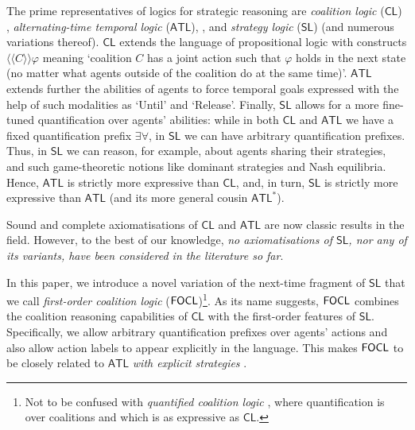\documentclass{article}
\begin{document}
The prime representatives of logics for strategic reasoning are \textit{coalition logic} ($\mathsf{CL}$) \cite{pauly02}, \textit{alternating-time temporal logic} ($\mathsf{ATL}$), \cite{alur02}, and \textit{strategy logic} ($\mathsf{SL}$) \cite{mogavero10} (and numerous variations thereof). $\mathsf{CL}$ extends the language of propositional logic with constructs $\langle \! \langle C \rangle \! \rangle \varphi$ meaning `coalition $C$ has a joint action such that $\varphi$ holds in the next state (no matter what agents outside of the coalition do at the same time)'. $\mathsf{ATL}$ extends further the abilities of agents to force temporal goals expressed with the help of such modalities as `\textsf{U}ntil' and `\textsf{R}elease'. Finally, $\mathsf{SL}$ allows for a more fine-tuned quantification over agents' abilities: while in both $\mathsf{CL}$ and $\mathsf{ATL}$ we have a fixed quantification prefix $\exists \forall$, in $\mathsf{SL}$ we can have arbitrary quantification prefixes. Thus, in $\mathsf{SL}$ we can reason, for example, about agents sharing their strategies, and such game-theoretic notions like dominant strategies and Nash equilibria.  Hence, $\mathsf{ATL}$ is strictly more expressive than $\mathsf{CL}$, and, in turn, $\mathsf{SL}$ is strictly more expressive than $\mathsf{ATL}$ (and its more general cousin $\mathsf{ATL}^\ast$).



Sound and complete axiomatisations of $\mathsf{CL}$ \cite{pauly02,goranko13} and $\mathsf{ATL}$ \cite{goranko06} are now classic results in the field. However, to the best of our knowledge, \textit{no axiomatisations of $\mathsf{SL}$, nor any of its variants, have been considered in the literature so far}. 

In this paper, we introduce a novel variation of the next-time fragment of $\mathsf{SL}$ that we call \textit{first-order coalition logic} ($\mathsf{FOCL}$)\footnote{Not to be confused with \textit{quantified coalition logic} \cite{agotnes08}, where quantification is over coalitions and which is as expressive as $\mathsf{CL}$.}. As its name suggests, $\mathsf{FOCL}$ combines the coalition reasoning capabilities of $\mathsf{CL}$ with the first-order features of $\mathsf{SL}$. %
Specifically, we allow arbitrary quantification prefixes over agents' actions and also allow action labels to appear explicitly in the language. This makes $\mathsf{FOCL}$ to be closely related to $\mathsf{ATL}$ \textit{with explicit strategies} \cite{walther07}. %
\end{document}
